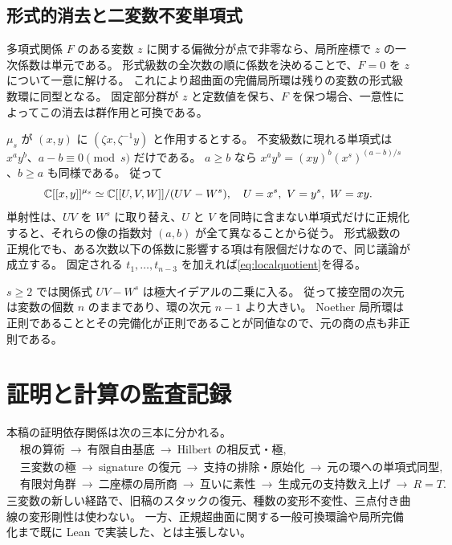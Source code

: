 \documentclass[11pt,a4paper]{ltjsarticle}
\numberwithin{equation}{section}
\theoremstyle{definition}
\begin{document}
\subsection{形式的消去と二変数不変単項式}
多項式関係 $F$ のある変数 $z$ に関する偏微分が点で非零なら、局所座標で $z$ の一次係数は単元である。
形式級数の全次数の順に係数を決めることで、$F=0$ を $z$ について一意に解ける。
これにより超曲面の完備局所環は残りの変数の形式級数環に同型となる。
固定部分群が $z$ と定数値を保ち、$F$ を保つ場合、一意性によってこの消去は群作用と可換である。

$\mu_s$ が $(x,y)$ に $(\zeta x,\zeta^{-1}y)$ と作用するとする。
不変級数に現れる単項式は $x^a y^b$、$a-b\equiv0\pmod s$ だけである。
$a\ge b$ なら $x^a y^b=(xy)^b(x^s)^{(a-b)/s}$、$b\ge a$ も同様である。
従って
\[
 \mathbb C[[x,y]]^{\mu_s}\simeq\mathbb C[[U,V,W]]/(UV-W^s),
 \quad U=x^s,\ V=y^s,\ W=xy.
\]
単射性は、$UV$ を $W^s$ に取り替え、$U$ と $V$ を同時に含まない単項式だけに正規化すると、それらの像の指数対 $(a,b)$ が全て異なることから従う。
形式級数の正規化でも、ある次数以下の係数に影響する項は有限個だけなので、同じ議論が成立する。
固定される $t_1,\dots,t_{n-3}$ を加えれば\eqref{eq:localquotient}を得る。

$s\ge2$ では関係式 $UV-W^s$ は極大イデアルの二乗に入る。
従って接空間の次元は変数の個数 $n$ のままであり、環の次元 $n-1$ より大きい。
Noether 局所環は正則であることとその完備化が正則であることが同値なので、元の商の点も非正則である。

\section{証明と計算の監査記録}\label{app:audit}
本稿の証明依存関係は次の三本に分かれる。
\begin{align*}
 &\text{根の算術}\ \longrightarrow\ \text{有限自由基底}\
   \longrightarrow\ \text{Hilbert の相反式・極},\\
 &\text{三変数の極}\ \longrightarrow\ \text{signature の復元}\
   \longrightarrow\ \text{支持の排除・原始化}\
   \longrightarrow\ \text{元の環への単項式同型},\\
 &\text{有限対角群}\ \longrightarrow\ \text{二座標の局所商}\
   \longrightarrow\ \text{互いに素性}\
   \longrightarrow\ \text{生成元の支持数え上げ}\
   \longrightarrow\ R=T.
\end{align*}
三変数の新しい経路で、旧稿のスタックの復元、種数の変形不変性、三点付き曲線の変形剛性は使わない。
一方、正規超曲面に関する一般可換環論や局所完備化まで既に Lean で実装した、とは主張しない。
\end{document}
